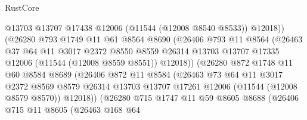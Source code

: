 \begin{lexlean}{RustCore}
\begin{coremodule}
                            @13703
                            @13707
                            @17438
                            @12006
                            (@11544 (@12008 @8540 @8533))
                            @12018))
                        (@26280
                          @793
                          @1749
                          @11
                          @61
                          @8564
                          @8690
                          (@26406
                            @793
                            @11
                            @8564
                            (@26463
                              @37
                              @64
                              @11
                              @3017
                              @2372
                              @8550
                              @8559
                              @26314
                              @13703
                              @13707
                              @17335
                              @12006
                              (@11544 (@12008 @8559 @8551))
                              @12018))
                          (@26280
                            @872
                            @1748
                            @11
                            @60
                            @8584
                            @8689
                            (@26406
                              @872
                              @11
                              @8584
                              (@26463
                                @73
                                @64
                                @11
                                @3017
                                @2372
                                @8569
                                @8579
                                @26314
                                @13703
                                @13707
                                @17261
                                @12006
                                (@11544 (@12008 @8579 @8570))
                                @12018))
                            (@26280
                              @715
                              @1747
                              @11
                              @59
                              @8605
                              @8688
                              (@26406
                                @715
                                @11
                                @8605
                                (@26463
                                  @168
                                  @64

\end{coremodule}
\end{lexlean}
